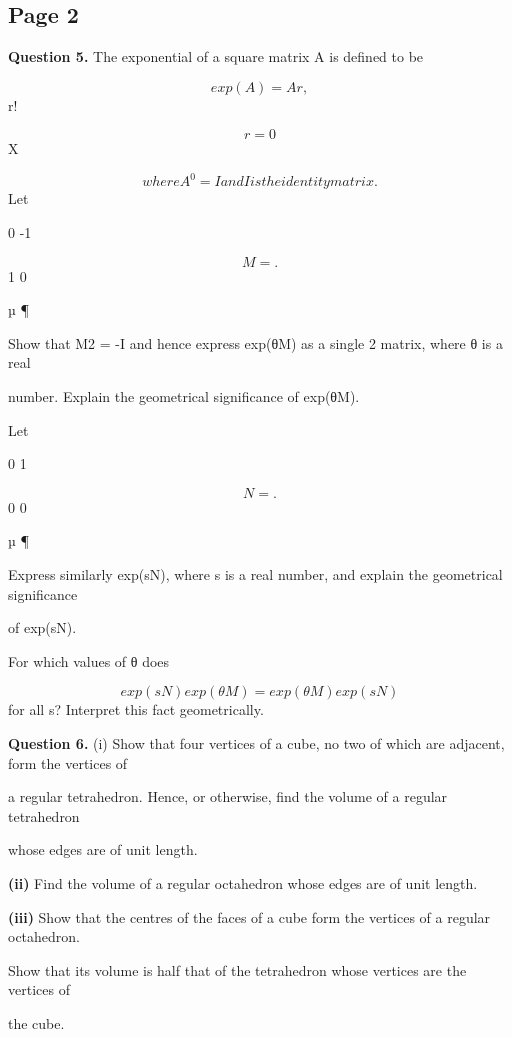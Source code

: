 \documentclass[12pt]{article}
\begin{document}
\subsection*{Page 2}
\begin{flushleft}
\bigskip\textbf{Question 5.} The exponential of a square matrix A is defined to be\par
\infty\par
\[exp(A) = Ar ,\]
r!\par
\[r=0\]
X\par
\[where A^0 = I and I is the identity matrix.\]
Let\par
0 -1\par
\[M = .\]
1 0\par
µ ¶\par
Show that M2 = -I and hence express exp(θM) as a single 2  matrix, where θ is a real\par
number. Explain the geometrical significance of exp(θM).\par
Let\par
0 1\par
\[N = .\]
0 0\par
µ ¶\par
Express similarly exp(sN), where s is a real number, and explain the geometrical significance\par
of exp(sN).\par
For which values of θ does\par
\[exp(sN) exp(θM) = exp(θM) exp(sN)\]
for all s? Interpret this fact geometrically.\par
\bigskip\textbf{Question 6.} (i) Show that four vertices of a cube, no two of which are adjacent, form the vertices of\par
a regular tetrahedron. Hence, or otherwise, find the volume of a regular tetrahedron\par
whose edges are of unit length.\par
\textbf{(ii)} Find the volume of a regular octahedron whose edges are of unit length.\par
\textbf{(iii)} Show that the centres of the faces of a cube form the vertices of a regular octahedron.\par
Show that its volume is half that of the tetrahedron whose vertices are the vertices of\par
the cube.\par
[A regular tetrahedron (octahedron) has four (eight) faces, all equilateral triangles.]\par
\end{flushleft}
\end{document}
